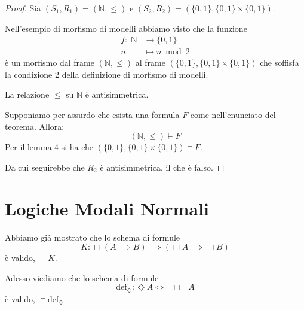 \documentclass[../main.tex]{subfiles}
\begin{document}
\begin{proof}
    Sia $(S_1,R_1) = (\mathbb{N},\leq)$ e $(S_2, R_2) = (\{0,1\}, \{0,1\} \times \{0,1\})$.

    Nell'esempio di morfismo di modelli abbiamo visto che la funzione
    \begin{align*}
        f: \; \mathbb{N} & \rightarrow \{0,1\} \\
        n                & \mapsto n \bmod 2
    \end{align*}
    è un morfismo dal frame $(\mathbb{N},\leq)$ al frame $(\{0,1\}, \{0,1\} \times \{0,1\})$ che soffisfa la condizione 2 della definizione di morfismo di modelli.

    La relazione $\leq$ su $\mathbb{N}$ è antisimmetrica.

    Supponiamo per assurdo che esista una formula $F$ come nell'enunciato del teorema. Allora:
    \begin{equation*}
        (\mathbb{N},\leq) \vDash F
    \end{equation*}
    Per il lemma 4 si ha che $(\{0,1\}, \{0,1\} \times \{0,1\}) \vDash F$.

    Da cui seguirebbe che $R_2$ è antisimmetrica, il che è falso. \Lightning
\end{proof}

\section{Logiche Modali Normali}
Abbiamo già mostrato che lo schema di formule
\begin{equation*}
    K: \Box (A \implies B) \implies (\Box A \implies \Box B)
\end{equation*}
è valido, $\vDash K$.

Adesso viediamo che lo schema di formule
\begin{equation*}
    \text{def}_\Diamond : \Diamond A \iff \neg \Box \neg A
\end{equation*}
è valido, $\vDash \text{def}_\Diamond$.
\end{document}
